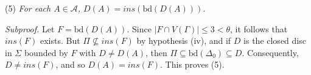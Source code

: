 \hspace*{12pt}(5) \textit{For each $A \in \mathcal{A}$, $D(A) = ins(\text{bd}(D(A)))$.}

\textit{Subproof.} Let $F = \text{bd}(D(A))$. Since $|F \cap V(\Gamma)| \le 3 < \theta$, it follows that $ins(F)$ exists. But $\Pi \not\subseteq ins(F)$ by hypothesis (iv), and if $D$ is the closed disc in $\Sigma$ bounded by $F$ with $D \ne D(A)$, then $\Pi \subseteq \text{bd}(\Delta_0) \subseteq D$. Consequently, $D \ne ins(F)$, and so $D(A) = ins(F)$. This proves (5).
